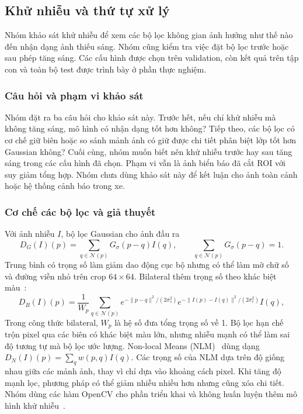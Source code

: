 \subsection{Khử nhiễu và thứ tự xử lý}
\label{sec:processing-extension}
Nhóm khảo sát khử nhiễu để xem các bộ lọc không gian ảnh hưởng như thế nào đến nhận dạng ảnh thiếu sáng. Nhóm cũng kiểm tra việc đặt bộ lọc trước hoặc sau phép tăng sáng. Các cấu hình được chọn trên validation, còn kết quả trên tập con và toàn bộ test được trình bày ở phần thực nghiệm.

\subsubsection{Câu hỏi và phạm vi khảo sát}
Nhóm đặt ra ba câu hỏi cho khảo sát này. Trước hết, nếu chỉ khử nhiễu mà không tăng sáng, mô hình có nhận dạng tốt hơn không? Tiếp theo, các bộ lọc có cơ chế giữ biên hoặc so sánh mảnh ảnh có giữ được chi tiết phân biệt lớp tốt hơn Gaussian không? Cuối cùng, nhóm muốn biết nên khử nhiễu trước hay sau tăng sáng trong các cấu hình đã chọn. Phạm vi vẫn là ảnh biển báo đã cắt ROI với suy giảm tổng hợp. Nhóm chưa dùng khảo sát này để kết luận cho ảnh toàn cảnh hoặc hệ thống cảnh báo trong xe.

\subsubsection{Cơ chế các bộ lọc và giả thuyết}
Với ảnh nhiễu $I$, bộ lọc Gaussian cho ảnh đầu ra
\begin{equation}
 D_G(I)(p)=\sum_{q\in\mathcal N(p)}G_{\sigma}(p-q)I(q),
 \qquad \sum_{q\in\mathcal N(p)}G_{\sigma}(p-q)=1.
\end{equation}
Trung bình có trọng số làm giảm dao động cục bộ nhưng có thể làm mờ chữ số và đường viền nhỏ trên crop $64\times64$. Bilateral thêm trọng số theo khác biệt màu~\cite{bilateral}:
\begin{equation}
 D_B(I)(p)=\frac{1}{W_p}\sum_{q\in\mathcal N(p)}
 e^{-\|p-q\|^2/(2\sigma_s^2)}
 e^{-\|I(p)-I(q)\|^2/(2\sigma_c^2)}I(q),
\end{equation}
Trong công thức bilateral, $W_p$ là hệ số đưa tổng trọng số về 1. Bộ lọc hạn chế trộn pixel qua các biên có khác biệt màu lớn, nhưng nhiễu mạnh có thể làm sai độ tương tự mà bộ lọc ước lượng. Non-local Means (NLM)~\cite{nlm} dùng dạng $D_N(I)(p)=\sum_q w(p,q)I(q)$. Các trọng số của NLM dựa trên độ giống nhau giữa các mảnh ảnh, thay vì chỉ dựa vào khoảng cách pixel. Khi tăng độ mạnh lọc, phương pháp có thể giảm nhiễu nhiều hơn nhưng cũng xóa chi tiết. Nhóm dùng các hàm OpenCV cho phần triển khai và không huấn luyện thêm mô hình khử nhiễu~\cite{opencv_filter,opencv_nlm}.

